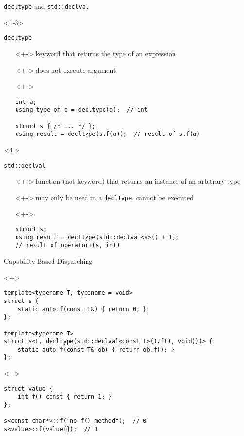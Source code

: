 \documentclass[table]{beamer}
\begin{document}
\begin{frame}[fragile]{\texttt{decltype} and \texttt{std::declval}}
  \begin{onlyenv}<1-3>
    \begin{block}{\texttt{decltype}}
      \begin{itemize}
      \item[]<+-> keyword that returns the type of an expression
      \item[]<+-> does not execute argument
      \item[]<+->
        \begin{verbatim}
int a;
using type_of_a = decltype(a);  // int
  
struct s { /* ... */ };
using result = decltype(s.f(a));  // result of s.f(a)
        \end{verbatim}
      \end{itemize}
    \end{block}
  \end{onlyenv}

  \begin{onlyenv}<4->
    \begin{block}{\texttt{std::declval}}
      \begin{itemize}
      \item[]<+-> function (not keyword) that returns an instance of an
        arbitrary type
      \item[]<+-> may only be used in a \texttt{decltype}, cannot be executed
      \item[]<+->
        \begin{verbatim}
struct s;
using result = decltype(std::declval<s>() + 1); 
// result of operator+(s, int)
        \end{verbatim}
      \end{itemize}
    \end{block}
  \end{onlyenv}
\end{frame}

\begin{frame}[fragile]{Capability Based Dispatching}
  \begin{onlyenv}<+>
    \begin{verbatim}
template<typename T, typename = void>
struct s {
    static auto f(const T&) { return 0; }
};

template<typename T>
struct s<T, decltype(std::declval<const T>().f(), void())> {
    static auto f(const T& ob) { return ob.f(); }
};
    \end{verbatim}
  \end{onlyenv}

  \begin{onlyenv}<+>
    \begin{verbatim}
struct value {
    int f() const { return 1; }
};

s<const char*>::f("no f() method");  // 0
s<value>::f(value{});  // 1
    \end{verbatim}
  \end{onlyenv}
\end{frame}
\end{document}
